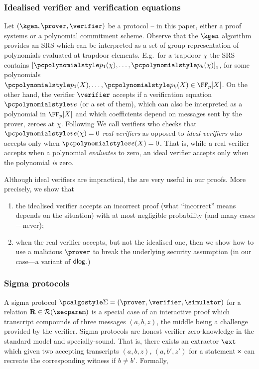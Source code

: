 \documentclass[runningheads,11pt]{llncs}
\begin{document}
\subsubsection{Idealised verifier and verification equations}
Let $(\kgen, \prover, \verifier)$ be a protocol -- in this paper, either a proof
systems or a polynomial commitment scheme. Observe that the $\kgen$ algorithm
provides an SRS which can be interpreted as a set of group representation of
polynomials evaluated at trapdoor elements. E.g.~for a trapdoor $\chi$ the SRS
contains $\gone{\p{p_1}(\chi), \ldots, \p{p_k}(\chi)}$, for some polynomials
$\p{p_1}(X), \ldots, \p{p_k}(X) \in \FF_p[X]$. On the other hand, the verifier
$\verifier$ accepts if a verification equation $\vereq$ (or a set of them),
which can also be interpreted as a polynomial in $\FF_p[X]$ and which
coefficients depend on messages sent by the prover, zeroes at $\chi$. Following
\cite{EPRINT:GabWilCio19} We call verifiers who checks that $\vereq(\chi) = 0$
\emph{real verifiers} as opposed to \emph{ideal verifiers} who accepts only when
$\vereq(X) = 0$. That is, while a real verifier accepts when a polynomial
\emph{evaluates} to zero, an ideal verifier accepts only when the polynomial
\emph{is} zero.

Although ideal verifiers are impractical, the are very useful in our
proofs. More precisely, we show that
\begin{enumerate}[(1)]
\item the idealised verifier accepts an incorrect proof (what ``incorrect''
  means depends on the situation) with at most negligible probability (and many
  cases---never);
\item when the real verifier accepts, but not the idealised one, then we show
  how to use a malicious $\prover$ to break the underlying security assumption
  (in our case---a variant of $\mathsf{dlog}$.)
\end{enumerate}

\subsubsection{Sigma protocols}
A sigma protocol $\sigmaprot = (\prover, \verifier, \simulator)$ for a relation
$\REL \in \RELGEN(\secparam)$ is a special case of an interactive proof which
transcript compounds of three messages $(a, b, z)$, the middle being a challenge
provided by the verifier. Sigma protocols are honest verifier zero-knowledge in
the standard model and specially-sound. That is, there exists an extractor
$\ext$ which given two accepting transcripts $(a, b, z)$, $(a, b', z')$ for a
statement $\mathsf{x}$ can recreate the corresponding witness if $b \neq b'$.
Formally,
\end{document}
